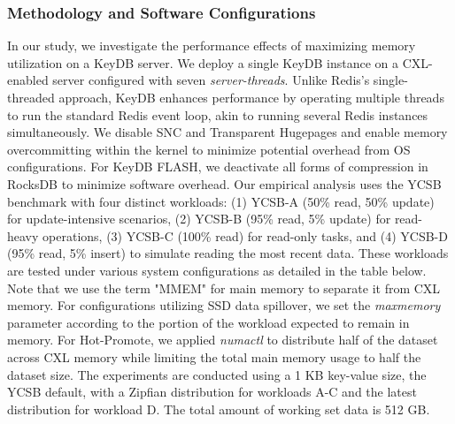 \subsubsection{Methodology and Software Configurations}

In our study, we investigate the performance effects of maximizing memory utilization on a KeyDB server. We deploy a single KeyDB instance on a CXL-enabled server configured with seven \textit{server-threads}. Unlike Redis's single-threaded approach, KeyDB enhances performance by operating multiple threads to run the standard Redis event loop, akin to running several Redis instances simultaneously. We disable SNC and Transparent Hugepages and enable memory overcommitting within the kernel to minimize potential overhead from OS configurations. For KeyDB FLASH, we deactivate all forms of compression in RocksDB to minimize software overhead. Our empirical analysis uses the YCSB benchmark with four distinct workloads: (1) YCSB-A (50\% read, 50\% update) for update-intensive scenarios, (2) YCSB-B (95\% read, 5\% update) for read-heavy operations, (3) YCSB-C (100\% read) for read-only tasks, and (4) YCSB-D (95\% read, 5\% insert) to simulate reading the most recent data. These workloads are tested under various system configurations as detailed in the table below. Note that we use the term "MMEM" for main memory to separate it from CXL memory. For configurations utilizing SSD data spillover, we set the \textit{maxmemory} parameter according to the portion of the workload expected to remain in memory. For Hot-Promote, we applied \textit{numactl} to distribute half of the dataset across CXL memory while limiting the total main memory usage to half the dataset size. The experiments are conducted using a 1 KB key-value size, the YCSB default, with a Zipfian distribution for workloads A-C and the latest distribution for workload D. The total amount of working set data is 512 GB.


